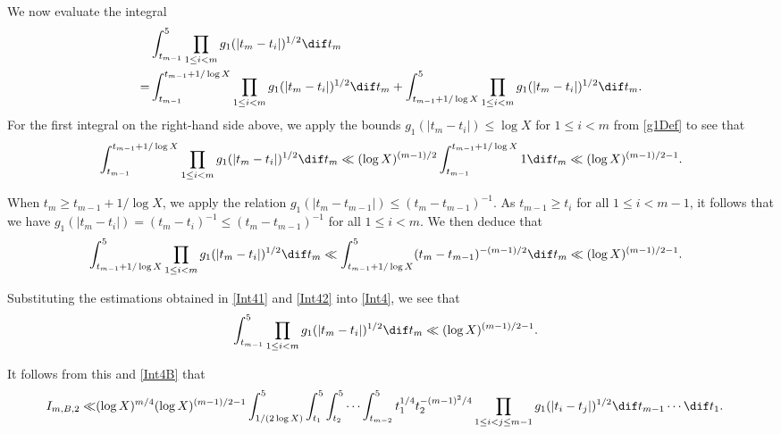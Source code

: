 \documentclass[twoside,leqno,10pt, A4]{amsart}
\begin{document}
   We now evaluate the integral
\begin{align}
\label{Int4}
\begin{split}
  & \int_{t_{m-1}}^{5}  \prod_{1\leq i< m} g_1(|t_m-t_i|)^{1/2}\dif t_m \\
  =& \int_{t_{m-1}}^{t_{m-1}+1/\log X} \prod_{1\leq i< m} g_1(|t_m-t_i|)^{1/2}\dif t_m+\int_{t_{m-1}+1/\log X}^{5}  \prod_{1\leq i< m} g_1(|t_m-t_i|)^{1/2}\dif t_m.
\end{split}
\end{align}
  For the first integral on the right-hand side above, we apply the bounds $g_1(|t_m-t_i|) \leq \log X$ for $1\leq i<m$ from \eqref{g1Def} to see that
\begin{align}
\label{Int41}
\begin{split}
  \int_{t_{m-1}}^{t_{m-1}+1/\log X} \prod_{1\leq i< m} g_1(|t_m-t_i|)^{1/2}\dif t_m \ll (\log X)^{(m-1)/2} \int_{t_{m-1}}^{t_{m-1}+1/\log X}  1\dif t_m
  \ll (\log X)^{(m-1)/2-1}.
\end{split}
\end{align}

   When $t_m \geq t_{m-1}+1/\log X$, we apply the relation $g_1(|t_m-t_{m-1}|) \leq (t_m-t_{m-1})^{-1}$. As $t_{m-1} \geq t_i$ for all $1 \leq i < m-1$, it follows that we have $g_1(|t_m-t_i|) = (t_m-t_i)^{-1} \leq (t_m-t_{m-1})^{-1}$ for all $1 \leq i <m$. We then deduce that
\begin{align}
\label{Int42}
\begin{split}
  & \int_{t_{m-1}+1/\log X}^{5}  \prod_{1\leq i< m} g_1(|t_m-t_i|)^{1/2}\dif t_m
  \ll  \int_{t_{m-1}+1/\log X}^{5}  (t_m-t_{m-1})^{-(m-1)/2}\dif t_m \ll  (\log X)^{(m-1)/2-1}.
\end{split}
\end{align}

   Substituting the estimations obtained in \eqref{Int41} and \eqref{Int42} into \eqref{Int4}, we see that
\begin{align*}
\begin{split}
  & \int_{t_{m-1}}^{5}  \prod_{1\leq i< m} g_1(|t_m-t_i|)^{1/2}\dif t_m \ll (\log X)^{(m-1)/2-1}.
\end{split}
\end{align*}

   It follows from this and \eqref{Int4B} that
\begin{align}
\label{Int4B3}
\begin{split}
  I_{m,B,2} \ll & (\log X)^{m/4}(\log X)^{(m-1)/2-1}\int_{1/(2\log X)}^{5}\int_{t_1}^{5}\int_{t_2}^{5}\cdots \int_{t_{m-2}}^{5}t_1^{1/4}t_2^{-(m-1)^2/4}\prod_{1\leq i<j\leq m-1} g_1(|t_i-t_j|)^{1/2}\dif t_{m-1} \cdots \dif t_1.
\end{split}
\end{align}
\end{document}
